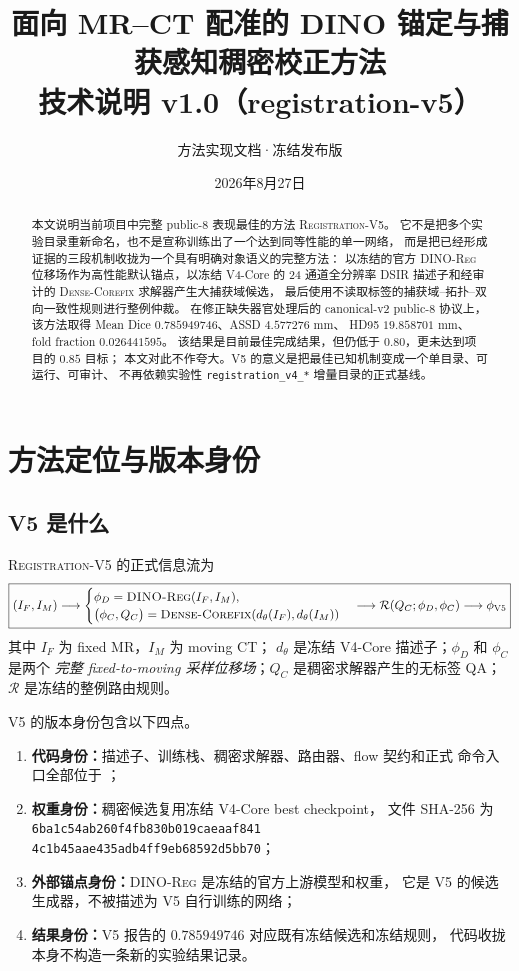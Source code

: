 \documentclass[11pt,a4paper]{ctexart}
\title{面向 MR--CT 配准的 DINO 锚定与捕获感知稠密校正方法\\
技术说明 v1.0（registration-v5）}
\author{方法实现文档·冻结发布版}
\date{2026年8月27日}
\newcommand{\Vfive}{\textsc{Registration-V5}}
\newcommand{\Dino}{\textsc{DINO-Reg}}
\newcommand{\Core}{\textsc{Dense-Corefix}}
\begin{document}
\maketitle

\begin{abstract}
本文说明当前项目中完整 public-8 表现最佳的方法 \Vfive。
它不是把多个实验目录重新命名，也不是宣称训练出了一个达到同等性能的单一网络，
而是把已经形成证据的三段机制收拢为一个具有明确对象语义的完整方法：
以冻结的官方 \Dino{} 位移场作为高性能默认锚点，以冻结 V4-Core 的
24 通道全分辨率 DSIR 描述子和经审计的 \Core{} 求解器产生大捕获域候选，
最后使用不读取标签的捕获域--拓扑--双向一致性规则进行整例仲裁。
在修正缺失器官处理后的 canonical-v2 public-8 协议上，
该方法取得 Mean Dice $0.785949746$、ASSD $4.577276$ mm、
HD95 $19.858701$ mm、fold fraction $0.026441595$。
该结果是目前最佳完成结果，但仍低于 $0.80$，更未达到项目的 $0.85$ 目标；
本文对此不作夸大。V5 的意义是把最佳已知机制变成一个单目录、可运行、可审计、
不再依赖实验性 \texttt{registration\_v4\_*} 增量目录的正式基线。
\end{abstract}

\tableofcontents

\section{方法定位与版本身份}

\subsection{V5 是什么}
\Vfive{} 的正式信息流为
\[
\boxed{
(I_F,I_M)
\longrightarrow
\begin{cases}
\phi_D=\Dino(I_F,I_M),\\
\bigl(\phi_C,Q_C\bigr)=
\Core\!\left(d_\theta(I_F),d_\theta(I_M)\right)
\end{cases}
\longrightarrow
\mathcal{R}(Q_C;\phi_D,\phi_C)
\longrightarrow \phi_{\mathrm{V5}}
}
\]
其中 $I_F$ 为 fixed MR，$I_M$ 为 moving CT；
$d_\theta$ 是冻结 V4-Core 描述子；$\phi_D$ 和 $\phi_C$ 是两个
\emph{完整 fixed-to-moving 采样位移场}；$Q_C$ 是稠密求解器产生的无标签 QA；
$\mathcal{R}$ 是冻结的整例路由规则。

V5 的版本身份包含以下四点。
\begin{enumerate}
  \item \textbf{代码身份：}描述子、训练栈、稠密求解器、路由器、flow 契约和正式
        命令入口全部位于 ；
  \item \textbf{权重身份：}稠密候选复用冻结 V4-Core best checkpoint，
        文件 SHA-256 为\\
        \texttt{\small 6ba1c54ab260f4fb830b019caeaaf841}\\
        \texttt{\small 4c1b45aae435adb4ff9eb68592d5bb70}；
  \item \textbf{外部锚点身份：}\Dino{} 是冻结的官方上游模型和权重，
        它是 V5 的候选生成器，不被描述为 V5 自行训练的网络；
  \item \textbf{结果身份：}V5 报告的 $0.785949746$ 对应既有冻结候选和冻结规则，
        代码收拢本身不构造一条新的实验结果记录。
\end{enumerate}
\end{document}
